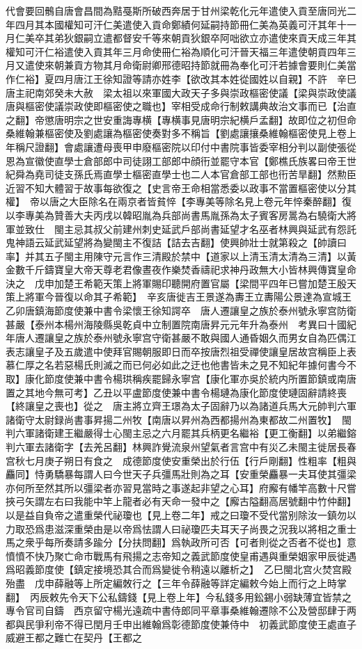 代會要回鶻自唐會昌間為黠戞斯所破西奔居于甘州梁乾化元年遣使入貢至唐同光二年四月其本國權知可汗仁美遣使入貢命鄭績何延嗣持節冊仁美為英義可汗其年十一月仁美卒其弟狄銀嗣立遣都督安千等來朝貢狄銀卒阿咄欲立亦遣使來貢天成三年其權知可汗仁裕遣使入貢其年三月命使冊仁裕為順化可汗晉天福三年遣使朝貢四年三月又遣使來朝兼貢方物其月命衛尉卿邢德昭持節就冊為奉化可汗若據會要則仁美當作仁裕】夏四月唐江王徐知證等請亦姓李【欲改其本姓從國姓以自親】不許　辛巳唐主祀南郊癸未大赦　梁太祖以來軍國大政天子多與崇政樞密使議【梁與崇政使議唐與樞密使議崇政使即樞密使之職也】宰相受成命行制敕講典故治文事而已【治直之翻】帝懲唐明宗之世安重誨專横【專横事見唐明宗紀横戶孟翻】故即位之初但命桑維翰兼樞密使及劉處讓為樞密使奏對多不稱旨【劉處讓攘桑維翰樞密使見上卷上年稱尺證翻】會處讓遭母喪甲申廢樞密院以印付中書院事皆委宰相分判以副使張從恩為宣徽使直學士倉部郎中司徒詡工部郎中顔衎並罷守本官【鄭樵氏族畧曰帝王世紀舜為堯司徒支孫氏焉直學士樞密直學士也二人本官倉部工部也衎苦旱翻】然勲臣近習不知大體習于故事每欲復之【史言帝王命相當悉委以政事不當置樞密使以分其權】　帝以唐之大臣除名在兩京者皆貧悴【李專美等除名見上卷元年悴秦醉翻】復以李專美為贊善大夫丙戌以韓昭胤為兵部尚書馬胤孫為太子賓客房暠為右驍衛大將軍並致仕　閩主忌其叔父前建州刺史延武戶部尚書延望才名巫者林興與延武有怨託鬼神語云延武延望將為變閩主不復詰【詰去吉翻】使興帥壯士就第殺之【帥讀曰率】并其五子閩主用陳守元言作三清殿於禁中【道家以上清玉清太清為三清】以黃金數千斤鑄寶皇大帝天尊老君像晝夜作樂焚香禱祀求神丹政無大小皆林興傳寶皇命決之　戊申加楚王希範天策上將軍賜印聽開府置官屬【梁間平四年已嘗加楚王殷天策上將軍今晉復以命其子希範】　辛亥唐徙吉王景遂為夀王立夀陽公景達為宣城王　乙卯唐鎮海節度使兼中書令梁懷王徐知諤卒　唐人遷讓皇之族於泰州號永寧宫防衛甚嚴【泰州本楊州海陵縣吳乾貞中立制置院南唐昇元元年升為泰州　考異曰十國紀年唐人遷讓皇之族於泰州號永寧宫守衛甚嚴不敢與國人通昏姻久而男女自為匹偶江表志讓皇子及五歲遣中使拜官賜朝服即日而卒按唐烈祖受禪使讓皇居故宫稱臣上表慕仁厚之名若惡楊氏則滅之而已何必如此之迂也他書皆未之見不知紀年據何書今不取】康化節度使兼中書令楊珙稱疾罷歸永寧宫【康化軍亦吳於統内所置節鎮或南唐置之其地今無可考】乙丑以平盧節度使兼中書令楊璉為康化節度使璉固辭請終喪【終讓皇之喪也】從之　唐主將立齊王璟為太子固辭乃以為諸道兵馬大元帥判六軍諸衛守太尉録尚書事昇揚二州牧【南唐以昇州為西都揚州為東都故二州置牧】　閩判六軍諸衛建王繼嚴得士心閩主忌之六月罷其兵柄更名繼裕【更工衡翻】以弟繼鎔判六軍去諸衛字【去羌呂翻】林興詐覺流泉州望氣者言宫中有災乙未閩主徙居長春宫秋七月庚子朔日有食之　成德節度使安重榮出於行伍【行戶剛翻】性粗率【粗與麤同】恃勇驕暴每謂人曰今世天子兵彊馬壯則為之耳【安重榮麤暴一夫耳使其彊梁亦何所至然其所以彊梁者亦習見當時之事遂起非望之心耳】府廨有幡竿高數十尺嘗挾弓矢謂左右曰我能中竿上龍者必有天命一發中之【廨古隘翻高居號翻中竹仲翻】以是益自負帝之遣重榮代祕瓊也【見上卷二年】戒之曰瓊不受代當别除汝一鎮勿以力取恐爲患滋深重榮由是以帝爲怯謂人曰祕瓊匹夫耳天子尚畏之況我以將相之重士馬之衆乎每所奏請多踰分【分扶問翻】爲執政所可否【可者則從之否者不從也】意憤憤不快乃聚亡命市戰馬有飛揚之志帝知之義武節度使皇甫遇與重榮姻家甲辰徙遇爲昭義節度使【鎮定接境恐其合而爲變徙令稍遠以離析之】　乙巳閩北宫火焚宫殿殆盡　戊申薛融等上所定編敇行之【三年令薛融等詳定編敕今始上而行之上時掌翻】　丙辰敕先令天下公私鑄錢【見上卷上年】今私錢多用鈆錫小弱缺薄宜皆禁之專令官司自鑄　西京留守楊光遠疏中書侍郎同平章事桑維翰遷除不公及營邸肆于两都與民爭利帝不得已閏月壬申出維翰爲彰德節度使兼侍中　初義武節度使王處直子威避王都之難亡在契丹【王都之